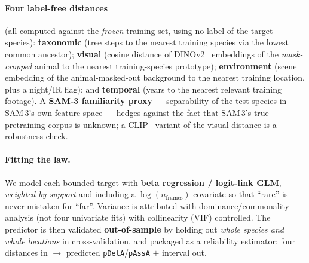 \documentclass[11pt]{article}
\begin{document}
\paragraph{Four label-free distances} (all computed against the \emph{frozen} training set, using no
label of the target species): \textbf{taxonomic} (tree steps to the nearest training species via the
lowest common ancestor); \textbf{visual} (cosine distance of DINOv2~\cite{dinov2} embeddings of the
\emph{mask-cropped} animal to the nearest training-species prototype); \textbf{environment} (scene
embedding of the animal-masked-out background to the nearest training location, plus a night/IR flag);
and \textbf{temporal} (years to the nearest relevant training footage). A \textbf{SAM-3 familiarity
proxy} --- separability of the test species in SAM\,3's own feature space --- hedges against the fact
that SAM\,3's true pretraining corpus is unknown; a CLIP~\cite{clip} variant of the visual distance is
a robustness check.

\paragraph{Fitting the law.} We model each bounded target with \textbf{beta regression / logit-link
GLM}, \emph{weighted by support} and including a $\log(n_\text{frames})$ covariate so that ``rare'' is
never mistaken for ``far''. Variance is attributed with dominance/commonality analysis (not four
univariate fits) with collinearity (VIF) controlled. The predictor is then validated
\textbf{out-of-sample} by holding out \emph{whole species and whole locations} in cross-validation, and
packaged as a reliability estimator: four distances in $\rightarrow$ predicted \texttt{pDetA}/\texttt{pAssA}
$+$ interval out.
\end{document}

